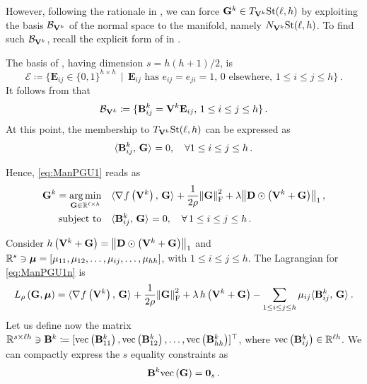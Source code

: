 However, following the rationale in , we can force $\mathbf{G}^k \in T_{\mathbf{V}^k}{\mathrm{St}({\ell},{h})}$ by exploiting the basis $\mathcal{B}_{\mathbf{V}^k}$ of the normal space to the manifold, namely $N_{\mathbf{V}^k}{\mathrm{St}({\ell},{h})}$.
To find such $\mathcal{B}_{\mathbf{V}^k}$, recall the explicit form of  in .

The basis of , having dimension $s=h (h+1)/2$, is 
\begin{equation}\label{eq:basis_sym}
    \mathcal{E} \coloneqq \{ \mathbf{E}_{ij} \in \{0,1\}^{h \times h} \, \mid \, \mathbf{E}_{ij} \text{ has } e_{ij}=e_{ji}=1, \, 0 \text{ elsewhere}, \, 1\leq i \leq j \leq h\}\,.
\end{equation}
It follows from  that
\begin{equation}\label{eq:basis_nvk}
    \mathcal{B}_{\mathbf{V}^k} \coloneqq \{ \mathbf{B}^{k}_{ij}=\mathbf{V}^k \mathbf{E}_{ij}, \, 1\leq i \leq j \leq h\}\,.
\end{equation}
At this point, the membership to $T_{\mathbf{V}^k}{\mathrm{St}({\ell},{h})}$ can be expressed as 
\begin{equation}
    \langle \mathbf{B}^{k}_{ij}, \, \mathbf{G} \rangle_{}=0, \quad \forall 1\leq i \leq j \leq h\,. 
\end{equation}

Hence, \eqref{eq:ManPGU1} reads as
\begin{equation}\label{eq:ManPGU1n}
    \begin{aligned}        
        \mathbf{G}^k = \operatorname*{arg\,min}_{\mathbf{G} \in \mathbb{R}^{\ell \times h}} &\quad \langle \nabla_{} f\left(\mathbf{V}^k\right), \, \mathbf{G} \rangle_{} + \frac{1}{2\rho} \norm{\mathbf{G}}_{\mathrm{F}}^2 + \lambda \norm{\mathbf{D} \odot \left(\mathbf{V}^k + \mathbf{G}\right)}_1 \, ,\\
        \textrm{subject to} &\quad \langle \mathbf{B}^{k}_{ij}, \, \mathbf{G} \rangle_{}=0, \quad \forall\, 1\leq i \leq j \leq h\,.
    \end{aligned}
\end{equation}

Consider $h\left(\mathbf{V}^k + \mathbf{G}\right)=\norm{\mathbf{D} \odot \left(\mathbf{V}^k + \mathbf{G}\right)}_1$ and $\mathbb{R}^{s} \ni \boldsymbol{\mu}=[\mu_{11}, \mu_{12}, \ldots, \mu_{ij},\dots, \mu_{hh}]$, with $1\leq i \leq j \leq h$.
The Lagrangian for \eqref{eq:ManPGU1n} is
\begin{equation}\label{eq:ManPGU1n_Lagr}
    L_\rho \left(\mathbf{G}, \boldsymbol{\mu} \right) = \langle \nabla_{} f\left(\mathbf{V}^k\right), \, \mathbf{G} \rangle_{} + \frac{1}{2\rho} \norm{\mathbf{G}}_{\mathrm{F}}^2 + \lambda \, h\left(\mathbf{V}^k + \mathbf{G}\right) - \sum_{1\leq i \leq j \leq h}\mu_{ij} \langle \mathbf{B}^{k}_{ij}, \, \mathbf{G} \rangle_{}\,.
\end{equation}
Let us define now the matrix $\mathbb{R}^{s \times \ell h} \ni \mathbf{B}^k \coloneqq [\mathrm{vec}\left(\mathbf{B}^{k}_{11}\right), \mathrm{vec}\left(\mathbf{B}^{k}_{12}\right), \ldots, \mathrm{vec}\left(\mathbf{B}^{k}_{hh}\right)]^\top$, where $\mathrm{vec}\left(\mathbf{B}^{k}_{ij}\right) \in \mathbb{R}^{\ell h}$.
We can compactly express the $s$ equality constraints as
\begin{equation}\label{eq:compact_eq_constraint}
    \mathbf{B}^k\mathrm{vec}\left(\mathbf{G}\right)=\boldsymbol{0}_{s}\,.
\end{equation}

